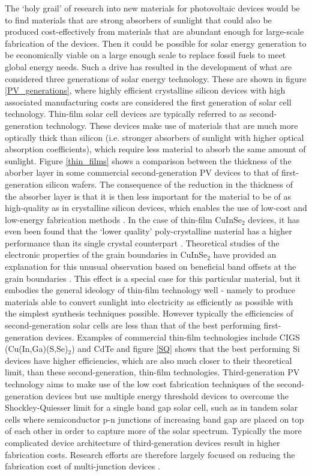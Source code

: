 The `holy grail' of research into new materials for photovoltaic devices would be to find materials that are strong absorbers of sunlight that could also be produced cost-effectively from materials that are abundant enough for large-scale fabrication of the devices. Then it could be possible for solar energy generation to be economically viable on a large enough scale to replace fossil fuels to meet global energy needs. Such a drive has resulted in the development of what are considered three generations of solar energy technology. These are shown in figure \ref{PV_generations}, where highly efficient crystalline silicon devices with high associated manufacturing costs are considered the first generation of solar cell technology.
Thin-film solar cell devices are typically referred to as second-generation technology. These devices make use of materials that are much more optically thick than silicon (i.e. stronger absorbers of sunlight with higher optical absorption coefficients), which require less material to absorb the same amount of sunlight. Figure \ref{thin_films} shows a comparison between the thickness of the aborber layer in some commercial second-generation PV devices to that of first-generation silicon wafers. The consequence of the reduction in the thickness of the absorber layer is that it is then less important for the material to be of as high-quality as in crystalline silicon devices, which enables the use of low-cost and low-energy fabrication methods \cite{emerging_pv}. 
In the case of thin-film CuInSe$_2$ devices, it has even been found that the `lower quality' poly-crystalline material has a higher performance than its single crystal counterpart \cite{CIS1_3, CIS1_4}. Theoretical studies of the electronic properties of the grain boundaries in CuInSe$_2$ have provided an explanation for this unusual observation based on beneficial band offsets at the grain boundaries \cite{CIS1, CIS2}. This effect is a special case for this particular material, but it embodies the general ideology of thin-film technology well - namely to produce materials able to convert sunlight into electricity as efficiently as possible with the simplest synthesis techniques possible.
However typically the efficiencies of second-generation solar cells are less than that of the best performing first-generation devices. Examples of commercial thin-film technologies include CIGS (Cu(In,Ga)(S,Se)$_2$) and CdTe and figure \ref{SQ} shows that the best performing Si devices have higher efficiencies, which are also much closer to their theoretical limit, than these second-generation, thin-film technologies.
Third-generation PV technology aims to make use of the low cost fabrication techniques of the second-generation devices but use multiple energy threshold devices to overcome the Shockley-Quiesser limit for a single band gap solar cell, such as in tandem solar cells where semiconductor p-n junctions of increasing band gap are placed on top of each other in order to capture more of the solar spectrum. Typically the more complicated device architecture of third-generation devices result in higher fabrication costs. Research efforts are therefore largely focused on reducing the fabrication cost of multi-junction devices \cite{3rd_gen}.\\

